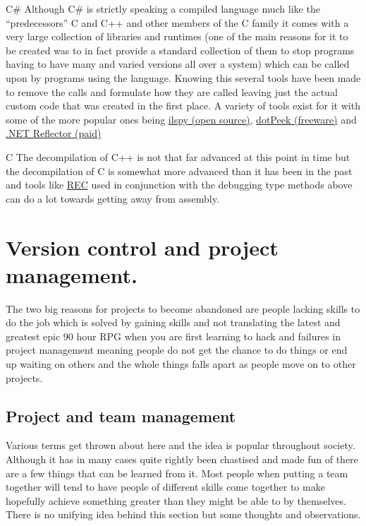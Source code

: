 \documentclass[
]{book}
\begin{document}
C\# Although C\# is strictly speaking a compiled language much like the ``predecessors'' C and C++ and other members of the C family it comes with a very large collection of libraries and runtimes (one of the main reasons for it to be created was to in fact provide a standard collection of them to stop programs having to have many and varied versions all over a system) which can be called upon by programs using the language. Knowing this several tools have been made to remove the calls and formulate how they are called leaving just the actual custom code that was created in the first place. A variety of tools exist for it with some of the more popular ones being \href{http://wiki.sharpdevelop.net/ilspy.ashx}{ilspy (open source)}, \href{http://www.jetbrains.com/decompiler/}{dotPeek (freeware)} and \href{http://www.reflector.net/}{.NET Reflector (paid)}

C The decompilation of C++ is not that far advanced at this point in time but the decompilation of C is somewhat more advanced than it has been in the past and tools like \href{http://www.backerstreet.com/rec/rec.htm}{REC} used in conjunction with the debugging type methods above can do a lot towards getting away from assembly.

\hypertarget{version-control-and-project-management.}{%
\chapter{Version control and project management.}\label{version-control-and-project-management.}}

The two big reasons for projects to become abandoned are people lacking skills to do the job which is solved by gaining skills and not translating the latest and greatest epic 90 hour RPG when you are first learning to hack and failures in project management meaning people do not get the chance to do things or end up waiting on others and the whole things falls apart as people move on to other projects.

\hypertarget{project-and-team-management}{%
\section{Project and team management}\label{project-and-team-management}}

Various terms get thrown about here and the idea is popular throughout society. Although it has in many cases quite rightly been chastised and made fun of there are a few things that can be learned from it. Most people when putting a team together will tend to have people of different skills come together to make hopefully achieve something greater than they might be able to by themselves. There is no unifying idea behind this section but some thoughts and observations.
\end{document}
